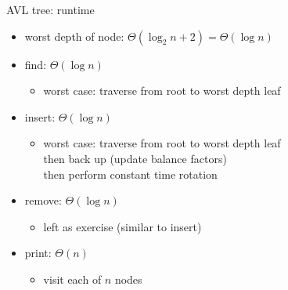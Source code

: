 \begin{frame}{AVL tree: runtime}
    \begin{itemize}
    \item worst depth of node: $\Theta(\log_2 n + 2) = \Theta(\log n)$
    \item find: $\Theta(\log n)$ 
        \begin{itemize}
            \item worst case: traverse from root to worst depth leaf
        \end{itemize}
    \item insert: $\Theta(\log n)$
        \begin{itemize}
            \item worst case: traverse from root to worst depth leaf \\
                then back up (update balance factors) \\
                then perform constant time rotation
        \end{itemize}
    \item remove: $\Theta(\log n)$
        \begin{itemize}
            \item left as exercise (similar to insert)
        \end{itemize}
    \item print: $\Theta(n)$
        \begin{itemize}
            \item visit each of $n$ nodes
        \end{itemize}
    \end{itemize}
\end{frame}
